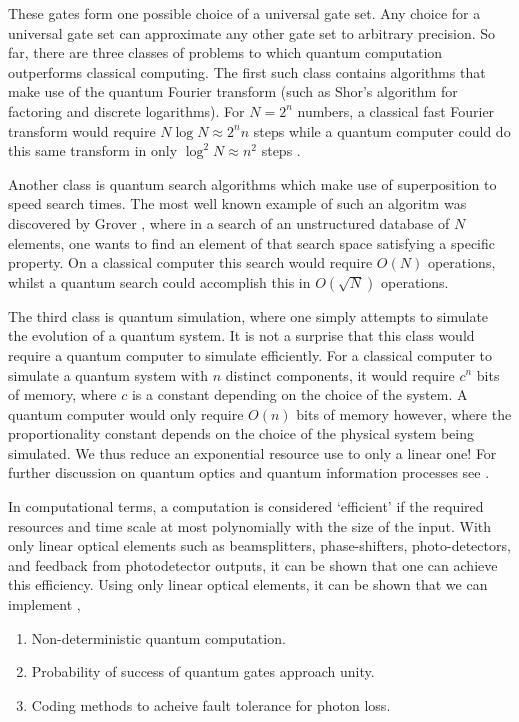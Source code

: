 \documentclass[aps,pra,twocolumn,amsmath,amssymb,nofootinbib,superscriptaddress]{revtex4}
\begin{document}
These gates form one possible choice of a universal gate set. Any choice for a universal gate set can approximate any other gate set to arbitrary precision. So far, there are three classes of problems to which quantum computation outperforms classical computing. The first such class contains algorithms that make use of the quantum Fourier transform (such as Shor's algorithm for factoring and discrete logarithms). For $ N=2^n$ numbers, a classical fast Fourier transform would require $ N \log{N} \approx 2^n n$ steps while a quantum computer could do this same transform in only $\log^2{N} \approx n^2$ steps \cite{nielsen}.

Another class is quantum search algorithms which make use of superposition to speed search times. The most well known example of such an algoritm was discovered by Grover \cite{grover}, where in a search of an unstructured database of $N$ elements, one wants to find an element of that search space satisfying a specific property. On a classical computer this search would require $O(N)$ operations, whilst a quantum search could accomplish this in $O(\sqrt{N})$ operations.

The third class is quantum simulation, where one simply attempts to simulate the evolution of a quantum system.  It is not a surprise that this class would require a quantum computer to simulate efficiently. For a classical computer to simulate a quantum system with $n$ distinct components, it would require $c^n$ bits of memory, where $c$ is a constant depending on the choice of the system. A quantum computer would only require $O(n)$ bits of memory however, where the proportionality constant depends on the choice of the physical system being simulated. We thus reduce an exponential resource use to only a linear one! For further discussion on quantum optics and quantum information processes see \cite{walls,aharonov,diVincenzo}.

In computational terms, a computation is considered `efficient' if the required resources and time scale at most polynomially with the size of the input. With only linear optical elements such as beamsplitters, phase-shifters, photo-detectors, and feedback from photodetector outputs, it can be shown that one can achieve this efficiency. Using only linear optical elements, it can be shown that we can implement \cite{knill},
\begin{enumerate}
\item{Non-deterministic quantum computation.} 
\item{Probability of success of quantum gates approach unity.}
\item{Coding methods to acheive fault tolerance for photon loss.} 
\end{enumerate}
\end{document}
